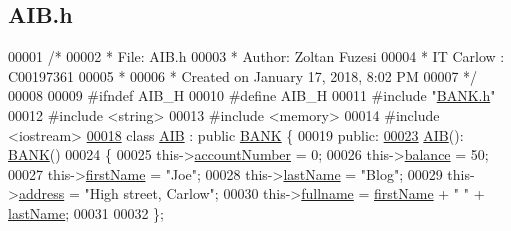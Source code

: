 \hypertarget{_a_i_b_8h_source}{}\subsection{A\+I\+B.\+h}

\begin{DoxyCode}
00001 \textcolor{comment}{/* }
00002 \textcolor{comment}{ * File:   AIB.h}
00003 \textcolor{comment}{ * Author: Zoltan Fuzesi}
00004 \textcolor{comment}{ * IT Carlow : C00197361}
00005 \textcolor{comment}{ *}
00006 \textcolor{comment}{ * Created on January 17, 2018, 8:02 PM}
00007 \textcolor{comment}{ */}
00008 
00009 \textcolor{preprocessor}{#ifndef AIB\_H}
00010 \textcolor{preprocessor}{#define AIB\_H}
00011 \textcolor{preprocessor}{#include "\hyperlink{_b_a_n_k_8h}{BANK.h}"}
00012 \textcolor{preprocessor}{#include <string>}
00013 \textcolor{preprocessor}{#include <memory>}
00014 \textcolor{preprocessor}{#include <iostream>}
\hypertarget{_a_i_b_8h_source.tex_l00018}{}\hyperlink{class_a_i_b}{00018} \textcolor{keyword}{class }\hyperlink{class_a_i_b}{AIB} : \textcolor{keyword}{public} \hyperlink{class_b_a_n_k}{BANK} \{
00019 \textcolor{keyword}{public}:
\hypertarget{_a_i_b_8h_source.tex_l00023}{}\hyperlink{class_a_i_b_a4783110463bf12f937a85b62455faf38_a4783110463bf12f937a85b62455faf38}{00023}     \hyperlink{class_a_i_b_a4783110463bf12f937a85b62455faf38_a4783110463bf12f937a85b62455faf38}{AIB}(): \hyperlink{class_b_a_n_k}{BANK}()
00024     \{
00025         this->\hyperlink{class_a_i_b_aafc08efeec5b8c800c32ee32f20603a7_aafc08efeec5b8c800c32ee32f20603a7}{accountNumber} = 0;
00026         this->\hyperlink{class_a_i_b_a3c8d637bd997c1f062d844a88e2559ba_a3c8d637bd997c1f062d844a88e2559ba}{balance} = 50;
00027         this->\hyperlink{class_a_i_b_a869f72057cb63ebf0cfd257069e15c7c_a869f72057cb63ebf0cfd257069e15c7c}{firstName} = \textcolor{stringliteral}{"Joe"};
00028         this->\hyperlink{class_a_i_b_ace7b8b648d1b44b7ee2f4be002952b7a_ace7b8b648d1b44b7ee2f4be002952b7a}{lastName} = \textcolor{stringliteral}{"Blog"};
00029         this->\hyperlink{class_a_i_b_ae6a67cc33d1e5fa83a52a238e45ca3dc_ae6a67cc33d1e5fa83a52a238e45ca3dc}{address} = \textcolor{stringliteral}{"High street, Carlow"};
00030         this->\hyperlink{class_a_i_b_a818b0cc283af23127c067fb3fc751058_a818b0cc283af23127c067fb3fc751058}{fullname} = \hyperlink{class_a_i_b_a869f72057cb63ebf0cfd257069e15c7c_a869f72057cb63ebf0cfd257069e15c7c}{firstName} + \textcolor{stringliteral}{" "} + \hyperlink{class_a_i_b_ace7b8b648d1b44b7ee2f4be002952b7a_ace7b8b648d1b44b7ee2f4be002952b7a}{lastName};
00031     
00032     \};

\end{DoxyCode}
